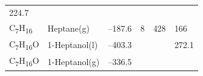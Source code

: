 \documentclass[
  9pt,
]{extbook}
\theoremstyle{definition}
\theoremstyle{definition}
\theoremstyle{definition}
\theoremstyle{remark}
\begin{document}
\begin{longtable}[]{@{}llllll@{}}
\begin{minipage}[t]{0.14\columnwidth}
224.7\strut
\end{minipage}\tabularnewline
\begin{minipage}[t]{0.07\columnwidth}\raggedright
C\textsubscript{7}H\textsubscript{16}\strut
\end{minipage} & \begin{minipage}[t]{0.17\columnwidth}\raggedright
Heptane(g)\strut
\end{minipage} & \begin{minipage}[t]{0.15\columnwidth}\raggedright
--187.6\strut
\end{minipage} & \begin{minipage}[t]{0.15\columnwidth}\raggedright
8\strut
\end{minipage} & \begin{minipage}[t]{0.14\columnwidth}\raggedright
428\strut
\end{minipage} & \begin{minipage}[t]{0.14\columnwidth}\raggedright
166\strut
\end{minipage}\tabularnewline
\begin{minipage}[t]{0.07\columnwidth}\raggedright
C\textsubscript{7}H\textsubscript{16}O\strut
\end{minipage} & \begin{minipage}[t]{0.17\columnwidth}\raggedright
1-Heptanol(l)\strut
\end{minipage} & \begin{minipage}[t]{0.15\columnwidth}\raggedright
--403.3\strut
\end{minipage} & \begin{minipage}[t]{0.15\columnwidth}\raggedright
\strut
\end{minipage} & \begin{minipage}[t]{0.14\columnwidth}\raggedright
\strut
\end{minipage} & \begin{minipage}[t]{0.14\columnwidth}\raggedright
272.1\strut
\end{minipage}\tabularnewline
\begin{minipage}[t]{0.07\columnwidth}\raggedright
C\textsubscript{7}H\textsubscript{16}O\strut
\end{minipage} & \begin{minipage}[t]{0.17\columnwidth}\raggedright
1-Heptanol(g)\strut
\end{minipage} & \begin{minipage}[t]{0.15\columnwidth}\raggedright
--336.5\strut
\end{minipage} & \begin{minipage}[t]{0.15\columnwidth}\raggedright

\end{minipage}
\end{longtable}
\end{document}
